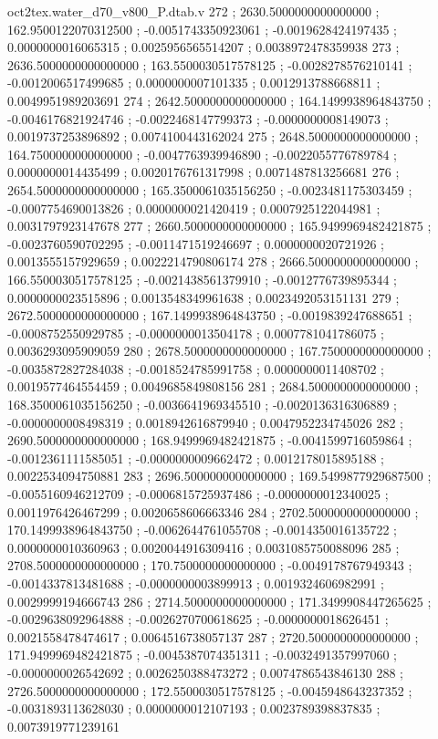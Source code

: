 \begin{filecontents}[overwrite]{oct2tex.water_d70_v800_P.dtab.v}
272 ; 2630.5000000000000000 ; 162.9500122070312500 ; -0.0051743350923061 ; -0.0019628424197435 ; 0.0000000016065315 ; 0.0025956565514207 ; 0.0038972478359938
273 ; 2636.5000000000000000 ; 163.5500030517578125 ; -0.0028278576210141 ; -0.0012006517499685 ; 0.0000000007101335 ; 0.0012913788668811 ; 0.0049951989203691
274 ; 2642.5000000000000000 ; 164.1499938964843750 ; -0.0046176821924746 ; -0.0022468147799373 ; -0.0000000008149073 ; 0.0019737253896892 ; 0.0074100443162024
275 ; 2648.5000000000000000 ; 164.7500000000000000 ; -0.0047763939946890 ; -0.0022055776789784 ; 0.0000000014435499 ; 0.0020176761317998 ; 0.0071487813256681
276 ; 2654.5000000000000000 ; 165.3500061035156250 ; -0.0023481175303459 ; -0.0007754690013826 ; 0.0000000021420419 ; 0.0007925122044981 ; 0.0031797923147678
277 ; 2660.5000000000000000 ; 165.9499969482421875 ; -0.0023760590702295 ; -0.0011471519246697 ; 0.0000000020721926 ; 0.0013555157929659 ; 0.0022214790806174
278 ; 2666.5000000000000000 ; 166.5500030517578125 ; -0.0021438561379910 ; -0.0012776739895344 ; 0.0000000023515896 ; 0.0013548349961638 ; 0.0023492053151131
279 ; 2672.5000000000000000 ; 167.1499938964843750 ; -0.0019839247688651 ; -0.0008752550929785 ; -0.0000000013504178 ; 0.0007781041786075 ; 0.0036293095909059
280 ; 2678.5000000000000000 ; 167.7500000000000000 ; -0.0035872827284038 ; -0.0018524785991758 ; 0.0000000011408702 ; 0.0019577464554459 ; 0.0049685849808156
281 ; 2684.5000000000000000 ; 168.3500061035156250 ; -0.0036641969345510 ; -0.0020136316306889 ; -0.0000000008498319 ; 0.0018942616879940 ; 0.0047952234745026
282 ; 2690.5000000000000000 ; 168.9499969482421875 ; -0.0041599716059864 ; -0.0012361111585051 ; -0.0000000009662472 ; 0.0012178015895188 ; 0.0022534094750881
283 ; 2696.5000000000000000 ; 169.5499877929687500 ; -0.0055160946212709 ; -0.0006815725937486 ; -0.0000000012340025 ; 0.0011976426467299 ; 0.0020658606663346
284 ; 2702.5000000000000000 ; 170.1499938964843750 ; -0.0062644761055708 ; -0.0014350016135722 ; 0.0000000010360963 ; 0.0020044916309416 ; 0.0031085750088096
285 ; 2708.5000000000000000 ; 170.7500000000000000 ; -0.0049178767949343 ; -0.0014337813481688 ; -0.0000000003899913 ; 0.0019324606982991 ; 0.0029999194666743
286 ; 2714.5000000000000000 ; 171.3499908447265625 ; -0.0029638092964888 ; -0.0026270700618625 ; -0.0000000018626451 ; 0.0021558478474617 ; 0.0064516738057137
287 ; 2720.5000000000000000 ; 171.9499969482421875 ; -0.0045387074351311 ; -0.0032491357997060 ; -0.0000000026542692 ; 0.0026250388473272 ; 0.0074786543846130
288 ; 2726.5000000000000000 ; 172.5500030517578125 ; -0.0045948643237352 ; -0.0031893113628030 ; 0.0000000012107193 ; 0.0023789398837835 ; 0.0073919771239161

\end{filecontents}
